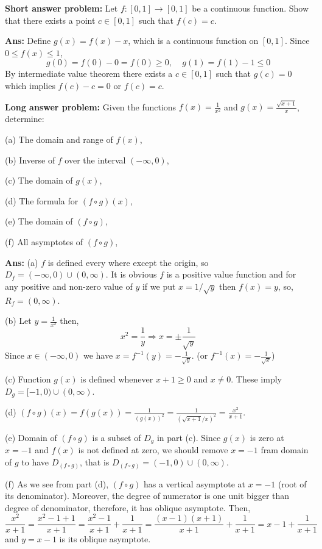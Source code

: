 \documentclass[11pt]{article}
\begin{document}
\vspace{1cm}

{\bf Short answer problem:} Let $f:[0,1]\longrightarrow[0,1]$ be a continuous function. Show that there exists a point $c\in[0,1]$ such that $f(c)=c$.

{\bf Ans:} Define $g(x)=f(x)-x$, which is a continuous function on $[0,1]$. Since $0\leq f(x)\leq1$,
$$g(0)=f(0)-0=f(0)\geq0,\ \ \ \ \ g(1)=f(1)-1\leq0$$
By intermediate value theorem there exists a $c\in[0,1]$ such that $g(c)=0$ which implies $f(c)-c=0$ or $f(c)=c$.

\vspace{1cm}

{\bf Long answer problem:} Given the functions $f(x)=\frac{1}{x^2}$ and $g(x)=\frac{\sqrt{x+1}}{x}$, determine:\par
(a) The domain and range of $f(x)$,\par
(b) Inverse of $f$ over the interval $(-\infty,0)$,\par
(c) The domain of $g(x)$,\par
(d) The formula for $(f\circ g)(x)$,\par
(e) The domain of $(f\circ g)$,\par
(f) All asymptotes of $(f\circ g)$,\par

{\bf Ans:} (a) $f$ is defined every where except the origin, so $D_f=(-\infty,0)\cup(0,\infty)$. It is obvious $f$ is a positive value function and for any positive and non-zero value of $y$ if we put $x=1/\sqrt{y}$ then $f(x)=y$, so, $R_f=(0,\infty)$.\par
(b) Let $y=\frac{1}{x^2}$ then,
$$x^2=\frac{1}{y} \Longrightarrow x=\pm\frac{1}{\sqrt{y}}$$
Since $x\in(-\infty,0)$ we have $x=f^{-1}(y)=-\frac{1}{\sqrt{y}}$. (or $f^{-1}(x)=-\frac{1}{\sqrt{x}}$)\par
(c) Function $g(x)$ is defined whenever $x+1\geq0$ and $x\neq0$. These imply $D_g=[-1,0)\cup(0,\infty)$.\par
(d) $(f\circ g)(x)=f(g(x))=\frac{1}{(g(x))^2}=\frac{1}{(\sqrt{x+1}/x)^2}=\frac{x^2}{x+1}$.\par
(e) Domain of $(f\circ g)$ is a subset of $D_g$ in part (c). Since $g(x)$ is zero at $x=-1$ and $f(x)$ is not defined at zero, we should remove $x=-1$ fram domain of $g$ to have $D_{(f\circ g)}$, that is $D_{(f\circ g)}=(-1,0)\cup(0,\infty)$.\par
(f) As we see from part (d), $(f\circ g)$ has a vertical asymptote at $x=-1$ (root of its denominator). Moreover, the degree of numerator is one unit bigger than degree of denominator, therefore, it has oblique asymptote. Then,
$$\frac{x^2}{x+1}=\frac{x^2-1+1}{x+1}=\frac{x^2-1}{x+1}+\frac{1}{x+1}=\frac{(x-1)(x+1)}{x+1}+\frac{1}{x+1}=x-1+\frac{1}{x+1}$$
and $y=x-1$ is its oblique asymptote.
\end{document}
